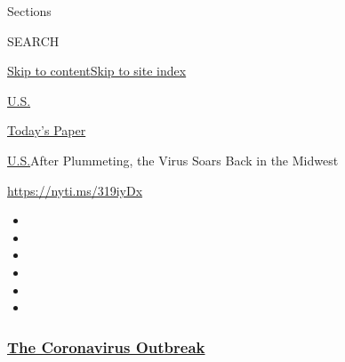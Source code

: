 Sections

SEARCH

\protect\hyperlink{site-content}{Skip to
content}\protect\hyperlink{site-index}{Skip to site index}

\href{https://www.nytimes3xbfgragh.onion/section/us}{U.S.}

\href{https://myaccount.nytimes3xbfgragh.onion/auth/login?response_type=cookie\&client_id=vi}{}

\href{https://www.nytimes3xbfgragh.onion/section/todayspaper}{Today's
Paper}

\href{/section/us}{U.S.}\textbar{}After Plummeting, the Virus Soars Back
in the Midwest

\url{https://nyti.ms/319iyDx}

\begin{itemize}
\item
\item
\item
\item
\item
\item
\end{itemize}

\hypertarget{the-coronavirus-outbreak}{%
\subsubsection{\texorpdfstring{\href{https://www.nytimes3xbfgragh.onion/news-event/coronavirus?name=styln-coronavirus-national\&region=TOP_BANNER\&variant=undefined\&block=storyline_menu_recirc\&action=click\&pgtype=Article\&impression_id=8b2e2c40-e396-11ea-b4b7-bf9bf7f05dd6}{The
Coronavirus
Outbreak}}{The Coronavirus Outbreak}}\label{the-coronavirus-outbreak}}

